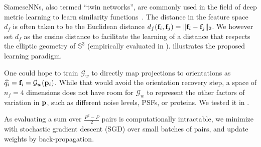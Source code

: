 SiameseNNs, also termed ``twin networks'', are commonly used in the field of deep metric learning to learn similarity functions~\cite{yi2014deep}.
The distance in the feature space $d_f$ is often taken to be the Euclidean distance $d_f(\mathbf{f}_i, \mathbf{f}_j) = \Vert \mathbf{f}_i - \mathbf{f}_j \Vert_2$.
We however set $d_f$ as the cosine distance to facilitate the learning of a distance that respects the elliptic geometry of $\mathbb{S}^3$ (empirically evaluated in ).
 illustrates the proposed learning paradigm.

One could hope to train $\mathcal{G}_w$ to directly map projections to orientations as $\widehat{q_i} = \mathbf{f}_i = \mathcal{G}_w(\mathbf{p}_i)$.
While that would avoid the orientation recovery step, a space of $n_f=4$ dimensions does not have room for $\mathcal{G}_w$ to represent the other factors of variation in $\mathbf{p}$, such as different noise levels, PSFs, or proteins.
We tested it in .

As evaluating a sum over $\frac{P^2-P}{2}$ pairs is computationally intractable,
we minimize  with stochastic gradient descent (SGD) over small batches of pairs, and update weights by back-propagation.

